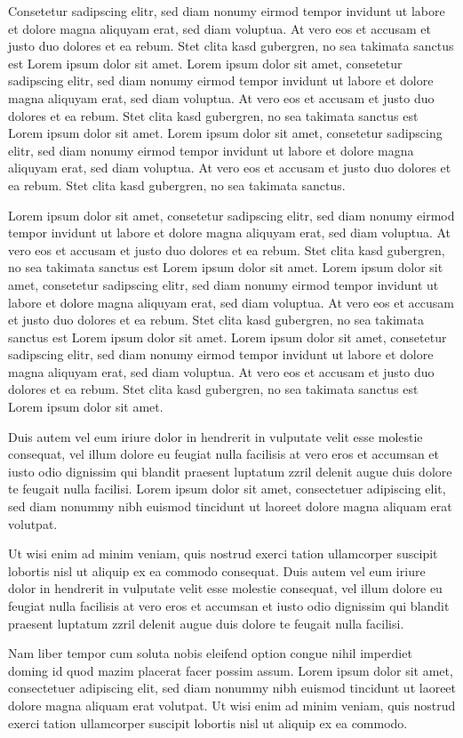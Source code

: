 Consetetur sadipscing elitr, sed diam nonumy eirmod tempor invidunt ut labore et dolore magna aliquyam erat, sed diam voluptua. At vero eos et accusam et justo duo dolores et ea rebum. Stet clita kasd gubergren, no sea takimata sanctus est Lorem ipsum dolor sit amet. Lorem ipsum dolor sit amet, consetetur sadipscing elitr, sed diam nonumy eirmod tempor invidunt ut labore et dolore magna aliquyam erat, sed diam voluptua. At vero eos et accusam et justo duo dolores et ea rebum. Stet clita kasd gubergren, no sea takimata sanctus est Lorem ipsum dolor sit amet. Lorem ipsum dolor sit amet, consetetur sadipscing elitr, sed diam nonumy eirmod tempor invidunt ut labore et dolore magna aliquyam erat, sed diam voluptua. At vero eos et accusam et justo duo dolores et ea rebum. Stet clita kasd gubergren, no sea takimata sanctus.

Lorem ipsum dolor sit amet, consetetur sadipscing elitr, sed diam nonumy eirmod tempor invidunt ut labore et dolore magna aliquyam erat, sed diam voluptua. At vero eos et accusam et justo duo dolores et ea rebum. Stet clita kasd gubergren, no sea takimata sanctus est Lorem ipsum dolor sit amet. Lorem ipsum dolor sit amet, consetetur sadipscing elitr, sed diam nonumy eirmod tempor invidunt ut labore et dolore magna aliquyam erat, sed diam voluptua. At vero eos et accusam et justo duo dolores et ea rebum. Stet clita kasd gubergren, no sea takimata sanctus est Lorem ipsum dolor sit amet. Lorem ipsum dolor sit amet, consetetur sadipscing elitr, sed diam nonumy eirmod tempor invidunt ut labore et dolore magna aliquyam erat, sed diam voluptua. At vero eos et accusam et justo duo dolores et ea rebum. Stet clita kasd gubergren, no sea takimata sanctus est Lorem ipsum dolor sit amet.

Duis autem vel eum iriure dolor in hendrerit in vulputate velit esse molestie consequat, vel illum dolore eu feugiat nulla facilisis at vero eros et accumsan et iusto odio dignissim qui blandit praesent luptatum zzril delenit augue duis dolore te feugait nulla facilisi. Lorem ipsum dolor sit amet, consectetuer adipiscing elit, sed diam nonummy nibh euismod tincidunt ut laoreet dolore magna aliquam erat volutpat.

Ut wisi enim ad minim veniam, quis nostrud exerci tation ullamcorper suscipit lobortis nisl ut aliquip ex ea commodo consequat. Duis autem vel eum iriure dolor in hendrerit in vulputate velit esse molestie consequat, vel illum dolore eu feugiat nulla facilisis at vero eros et accumsan et iusto odio dignissim qui blandit praesent luptatum zzril delenit augue duis dolore te feugait nulla facilisi.

Nam liber tempor cum soluta nobis eleifend option congue nihil imperdiet doming id quod mazim
placerat facer possim assum. Lorem ipsum dolor sit amet, consectetuer adipiscing elit, sed diam
nonummy nibh euismod tincidunt ut laoreet dolore magna aliquam erat volutpat. Ut wisi enim ad minim
veniam, quis nostrud exerci tation ullamcorper suscipit lobortis nisl ut aliquip ex ea commodo.



\printbibliography
